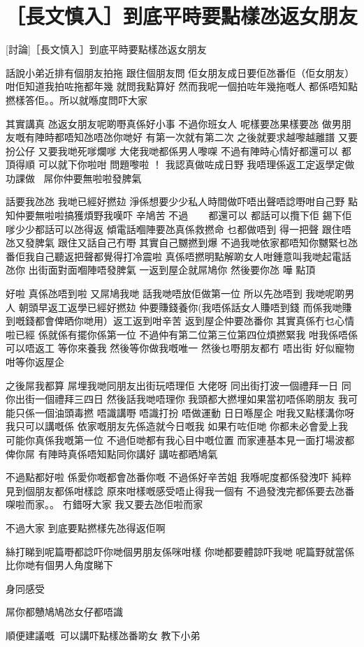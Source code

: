 \chapter{［長文慎入］到底平時要點樣氹返女朋友}

[討論]［長文慎入］到底平時要點樣氹返女朋友

話說小弟近排有個朋友拍拖 跟住個朋友問 佢女朋友成日要佢氹番佢（佢女朋友） 咁佢知道我拍咗拖都年幾 就問我點算好 然而我呢一個拍咗年幾拖嘅人 都係唔知點撚樣答佢。。所以就喺度問吓大家

其實講真 氹返女朋友呢啲嘢真係好小事 不過你班女人 呢樣要氹果樣要氹 做男朋友嘅有陣時都唔知氹唔氹你哋好 有第一次就有第二次 之後就要求越嚟越離譜 又要扮公仔 又要我哋死嗲爛嗲 大佬我哋都係男人嚟㗎 不過有陣時心情好都還可以 都頂得順 可以就下你啦咁 問題嚟啦 ！ 我認真做咗成日野 我唔理係返工定返學定做功課做 屌你仲要無啦啦發脾氣

話要我氹氹 我哋已經好撚攰 淨係想要少少私人時間做吓唔出聲唔諗嘢咁自己野 點知仲要無啦啦搞獲煩野我嘆吓 辛鳩苦 不過  都還可以 都話可以攬下佢 錫下佢 嗲少少都話可以氹得返 傾電話嗰陣要氹真係救撚命 乜都做唔到 得一把聲 跟住唔氹又發脾氣 跟住又話自己冇嘢 其實自己嬲撚到爆 不過我哋依家都唔知你嬲緊乜氹番佢我自己聽返把聲都覺得打冷震啦 真係唔撚明點解啲女人咁鍾意叫我哋起電話氹你 出街面對面嗰陣唔發脾氣 一返到屋企就屌鳩你 然後要你氹 嘩 點頂

好啦 真係氹唔到啦 又屌鳩我哋 話我哋唔放佢做第一位 所以先氹唔到 我哋呢啲男人 朝頭早返工返學已經好撚攰 仲要賺錢養你(我唔係話女人賺唔到錢 而係我哋賺到嘅錢都會俾晒你哋用）返工返到咁辛苦 返到屋企仲要氹番你 其實真係冇乜心情啦已經 係就係有擺你係第一位 不過仲有第二位第三位第四位煩撚緊我 咁我係唔係可以唔返工 等你來養我 然後等你做我嘅唯一 然後乜嘢朋友都冇 唔出街 好似寵物咁等你返屋企

之後屌我都算 屌埋我哋同朋友出街玩唔理佢 大佬呀 同出街打波一個禮拜一日 同你出街一個禮拜三四日 然後話我哋唔理你 我頭都大撚埋如果當初唔係啲朋友 我可能只係一個油頭毒撚 唔識講嘢 唔識打扮 唔做運動 日日喺屋企 咁我又點樣溝你呀 我只可以講嘅係 依家嘅朋友先係造就今日嘅我 如果冇咗佢哋 你都未必會愛上我 可能你真係我嘅第一位 不過佢哋都有我心目中嘅位置 而家連基本見一面打場波都俾你屌 有陣時真係唔知點同你講好 講咗都晒鳩氣

不過點都好啦 係愛你嘅都會氹番你嘅 不過係好辛苦姐 我喺呢度都係發洩吓 純粹見到個朋友都係咁樣諗 原來咁樣嘅感受唔止得我一個有 不過發洩完都係要去氹番㗎啦而家。。 冇錯呀大家 我又要去氹佢啦而家

不過大家 到底要點撚樣先氹得返佢啊

絲打睇到呢篇嘢都諗吓你哋個男朋友係咪咁樣 你哋都要體諒吓我哋 呢篇野就當係比你哋有個男人角度睇下

身同感受

屌你都戇鳩鳩氹女仔都唔識

順便建議嘅可以講吓點樣氹番啲女 教下小弟


